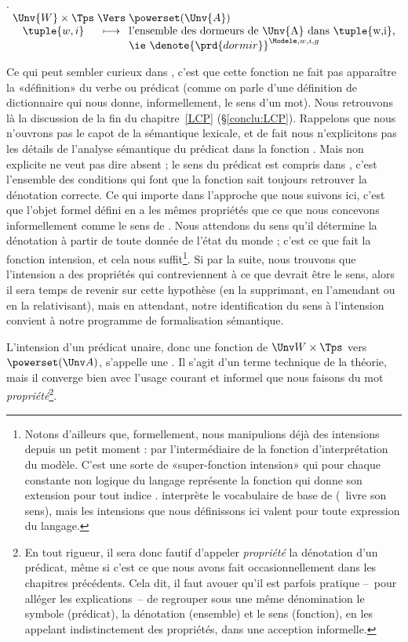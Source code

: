\ex.  
\(%
\begin{array}[t]{c@{\;}c@{\;}l}
\Unv{W}\times\Tps &\Vers& \powerset(\Unv{A})\\
\tuple{w,i} &\longmapsto& \text{l'ensemble des dormeurs de \Unv{A} dans \tuple{w,i},}\\
&& \text{\ie\ } \denote{\prd{dormir}}^{\Modele,w,i,g}
  \end{array}\)\label{intdormir}


Ce qui peut sembler curieux dans \Last, c'est que cette fonction ne fait pas apparaître la «définition» du verbe ou prédicat  (comme on parle d'une définition de dictionnaire qui nous donne, informellement, le sens d'un mot).  
Nous retrouvons là la discussion de la fin du chapitre~\ref{LCP} (\S\ref{conclu:LCP}).
Rappelons que nous n'ouvrons pas le capot de la sémantique lexicale, et de fait  nous n'explicitons pas les détails de l'analyse sémantique du prédicat dans la fonction \Last. 
Mais non explicite ne veut pas dire absent ; le sens du prédicat est compris dans \Last, c'est l'ensemble des conditions qui font que la fonction sait toujours retrouver la dénotation correcte. 
Ce qui importe dans l'approche que nous suivons ici, c'est que l'objet formel défini en {\Last} a les mêmes propriétés que ce que nous concevons informellement comme le sens de . 
Nous attendons du sens qu'il détermine la dénotation à partir de toute donnée de l'état du monde ; c'est ce que fait la fonction intension, et cela nous suffit\footnote{Notons d'ailleurs que, formellement, nous manipulions déjà des intensions depuis un petit moment : par l'intermédiaire de la fonction d'interprétation {\FI} du modèle. C'est une sorte de «super-fonction intension» qui pour chaque constante non logique du langage représente la fonction qui donne son extension pour tout indice . {\FI} interprète le vocabulaire de base de {\LO} (\ie\ livre son sens), mais les intensions que nous définissons ici valent pour toute expression du langage.}.
Si par la suite, nous trouvons que l'intension a des propriétés qui contreviennent à ce que devrait être le sens, alors il sera temps de revenir sur cette hypothèse (en la supprimant, en l'amendant ou en la relativisant), mais en attendant, notre identification du sens à l'intension convient à notre programme de formalisation sémantique.

L'intension d'un prédicat unaire,  donc une fonction de $\Unv W \times \Tps$ vers $\powerset(\Unv A)$, s'appelle une . Il s'agit d'un terme technique de la théorie, mais il converge bien avec l'usage courant et informel que nous faisons du mot \emph{propriété}\footnote{En tout rigueur, il sera donc fautif d'appeler \emph{propriété} la dénotation d'un prédicat, même si c'est ce que nous avons fait occasionnellement dans les chapitres précédents. Cela dit, il faut avouer qu'il est parfois pratique --~pour alléger les explications~-- de regrouper sous une même dénomination le symbole (prédicat), la dénotation (ensemble) et le sens (fonction), en les appelant indistinctement des propriétés, dans une acception informelle.}. 


